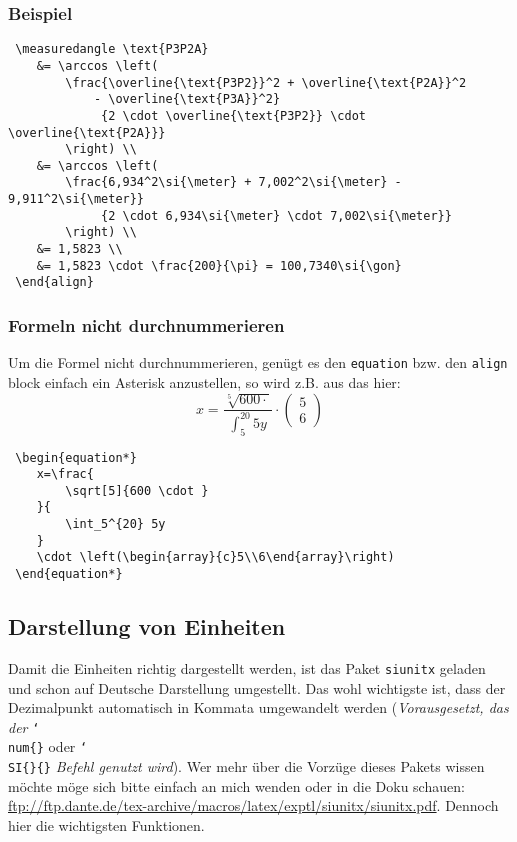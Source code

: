 \subsubsection*{Beispiel}
\begin{lstlisting}
 \measuredangle \text{P3P2A}
 	&= \arccos \left(
 		\frac{\overline{\text{P3P2}}^2 + \overline{\text{P2A}}^2
 		    - \overline{\text{P3A}}^2}
 		     {2 \cdot \overline{\text{P3P2}} \cdot \overline{\text{P2A}}}
 		\right) \\
 	&= \arccos \left(
 		\frac{6,934^2\si{\meter} + 7,002^2\si{\meter} - 9,911^2\si{\meter}}
 		     {2 \cdot 6,934\si{\meter} \cdot 7,002\si{\meter}}
 		\right) \\
 	&= 1,5823 \\
 	&= 1,5823 \cdot \frac{200}{\pi} = 100,7340\si{\gon}
 \end{align}
\end{lstlisting}

\subsubsection{Formeln nicht durchnummerieren}
Um die Formel nicht durchnummerieren, genügt es den \texttt{equation} bzw. den \texttt{align} block einfach ein Asterisk anzustellen, so wird z.B. aus  das hier:
\begin{equation*}
	x=\frac{
	    \sqrt[5]{600 \cdot }
	}{
		\int_5^{20} 5y
	}
	\cdot \left(\begin{array}{c}5\\6\end{array}\right)
\end{equation*}
\begin{lstlisting}
 \begin{equation*}
 	x=\frac{
 	    \sqrt[5]{600 \cdot }
 	}{
 		\int_5^{20} 5y
 	}
 	\cdot \left(\begin{array}{c}5\\6\end{array}\right)
 \end{equation*}
\end{lstlisting}

\subsection{Darstellung von Einheiten}
Damit die Einheiten richtig dargestellt werden, ist das Paket \texttt{siunitx} geladen und schon auf Deutsche Darstellung umgestellt. Das wohl wichtigste ist, dass der Dezimalpunkt automatisch in Kommata umgewandelt werden (\textit{Vorausgesetzt, das der }\texttt{\char`\\num\{\}} oder \texttt{\char`\\SI\{\}\{\}}\textit{ Befehl genutzt wird}). Wer mehr über die Vorzüge dieses Pakets wissen möchte möge sich bitte einfach an mich wenden oder in die Doku schauen: \url{ftp://ftp.dante.de/tex-archive/macros/latex/exptl/siunitx/siunitx.pdf}. Dennoch hier die wichtigsten Funktionen.
